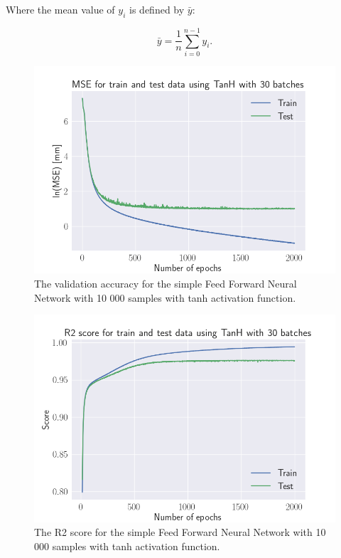 \documentclass[a4paper, UKenglish, 11pt]{uiomaster}
\begin{document}
Where the mean value of $y_i$ is defined by $\bar{y}$:

\begin{equation*}
\bar{y} =  \frac{1}{n} \sum_{i=0}^{n - 1} y_i.
\label{eq:ybar}
\end{equation*}


\begin{figure}[!htb]
    \centering
    \includegraphics[width=\linewidth]{../Code/plots/finals/MSE_NN_1_10000_TanH_30_2000.png}
    \caption{The validation accuracy for the simple Feed Forward Neural Network with 10 000 samples with tanh activation function. }
    \label{fig:single_dipole_accuracy}
\end{figure}

\begin{figure}[!htb]
    \centering
    \includegraphics[width=\linewidth]{../Code/plots/finals/R2_NN_1_10000_l1_TanH_30_2000.png}
    \caption{The R2 score for the simple Feed Forward Neural Network with 10 000 samples with tanh activation function. }
    \label{fig:single_dipole_R2}
\end{figure}
\end{document}
